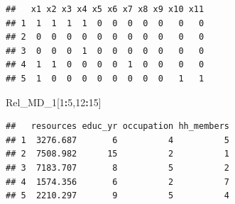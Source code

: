 \documentclass[]{book}
\newenvironment{Shaded}{\begin{snugshade}}{\end{snugshade}}
\newcommand{\DecValTok}[1]{\textcolor[rgb]{0.00,0.00,0.81}{#1}}
\newcommand{\KeywordTok}[1]{\textcolor[rgb]{0.13,0.29,0.53}{\textbf{#1}}}
\newcommand{\NormalTok}[1]{#1}
\newcommand{\OperatorTok}[1]{\textcolor[rgb]{0.81,0.36,0.00}{\textbf{#1}}}
\newcommand{\StringTok}[1]{\textcolor[rgb]{0.31,0.60,0.02}{#1}}
\begin{document}
\begin{Shaded}
\end{Shaded}

\begin{verbatim}
##   x1 x2 x3 x4 x5 x6 x7 x8 x9 x10 x11
## 1  1  1  1  1  0  0  0  0  0   0   0
## 2  0  0  0  0  0  0  0  0  0   0   0
## 3  0  0  0  1  0  0  0  0  0   0   0
## 4  1  1  0  0  0  0  1  0  0   0   0
## 5  1  0  0  0  0  0  0  0  0   1   1
\end{verbatim}

\begin{Shaded}
\begin{Highlighting}[]
\NormalTok{Rel_MD_}\DecValTok{1}\NormalTok{[}\DecValTok{1}\OperatorTok{:}\DecValTok{5}\NormalTok{,}\DecValTok{12}\OperatorTok{:}\DecValTok{15}\NormalTok{]}
\end{Highlighting}
\end{Shaded}

\begin{verbatim}
##   resources educ_yr occupation hh_members
## 1  3276.687       6          4          5
## 2  7508.982      15          2          1
## 3  7183.707       8          5          2
## 4  1574.356       6          2          7
## 5  2210.297       9          5          4
\end{verbatim}
\end{document}
